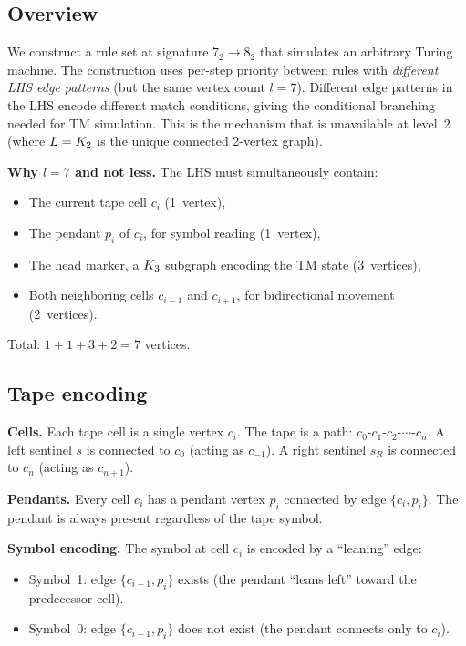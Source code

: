 \documentclass{../shared/primo}
\begin{document}
\subsection{Overview}

We construct a rule set at signature $7_2 \to 8_2$ that simulates an arbitrary Turing machine. The construction uses per-step priority between rules with \emph{different LHS edge patterns} (but the same vertex count $l = 7$). Different edge patterns in the LHS encode different match conditions, giving the conditional branching needed for TM simulation. This is the mechanism that is unavailable at level~2 (where $L = K_{2}$ is the unique connected 2-vertex graph).

\textbf{Why $l = 7$ and not less.} The LHS must simultaneously contain:
\begin{itemize}
\item The current tape cell $c_i$ (1~vertex),
\item The pendant $p_i$ of $c_i$, for symbol reading (1~vertex),
\item The head marker, a $K_{3}$ subgraph encoding the TM state (3~vertices),
\item Both neighboring cells $c_{i-1}$ and $c_{i+1}$, for bidirectional movement (2~vertices).
\end{itemize}
Total: $1 + 1 + 3 + 2 = 7$ vertices.

\subsection{Tape encoding}

\textbf{Cells.} Each tape cell is a single vertex $c_i$. The tape is a path: $c_0 \text{-} c_1 \text{-} c_2 \text{-} \cdots \text{-} c_n$. A left sentinel $s$ is connected to $c_0$ (acting as $c_{-1}$). A right sentinel $s_R$ is connected to $c_n$ (acting as $c_{n+1}$).

\textbf{Pendants.} Every cell $c_i$ has a pendant vertex $p_i$ connected by edge $\{c_i, p_i\}$. The pendant is always present regardless of the tape symbol.

\textbf{Symbol encoding.} The symbol at cell $c_i$ is encoded by a ``leaning'' edge:
\begin{itemize}
\item Symbol~1: edge $\{c_{i-1}, p_i\}$ exists (the pendant ``leans left'' toward the predecessor cell).
\item Symbol~0: edge $\{c_{i-1}, p_i\}$ does not exist (the pendant connects only to $c_i$).
\end{itemize}
\end{document}
